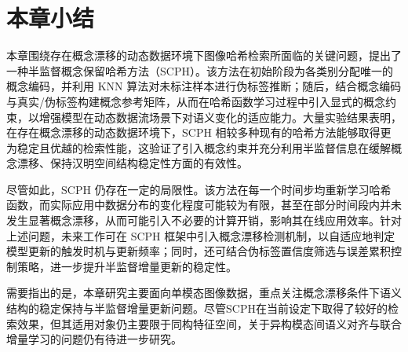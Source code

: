 \section{本章小结}

本章围绕存在概念漂移的动态数据环境下图像哈希检索所面临的关键问题，提出了一种半监督概念保留哈希方法（SCPH）。该方法在初始阶段为各类别分配唯一的概念编码，并利用 KNN 算法对未标注样本进行伪标签推断；随后，结合概念编码与真实/伪标签构建概念参考矩阵，从而在哈希函数学习过程中引入显式的概念约束，以增强模型在动态数据流场景下对语义变化的适应能力。大量实验结果表明，在存在概念漂移的动态数据环境下，SCPH 相较多种现有的哈希方法能够取得更为稳定且优越的检索性能，这验证了引入概念约束并充分利用半监督信息在缓解概念漂移、保持汉明空间结构稳定性方面的有效性。

尽管如此，SCPH 仍存在一定的局限性。该方法在每一个时间步均重新学习哈希函数，而实际应用中数据分布的变化程度可能较为有限，甚至在部分时间段内并未发生显著概念漂移，从而可能引入不必要的计算开销，影响其在线应用效率。针对上述问题，未来工作可在 SCPH 框架中引入概念漂移检测机制，以自适应地判定模型更新的触发时机与更新频率；同时，还可结合伪标签置信度筛选与误差累积控制策略，进一步提升半监督增量更新的稳定性。

需要指出的是，本章研究主要面向单模态图像数据，重点关注概念漂移条件下语义结构的稳定保持与半监督增量更新问题。尽管SCPH在当前设定下取得了较好的检索效果，但其适用对象仍主要限于同构特征空间，关于异构模态间语义对齐与联合增量学习的问题仍有待进一步研究。
